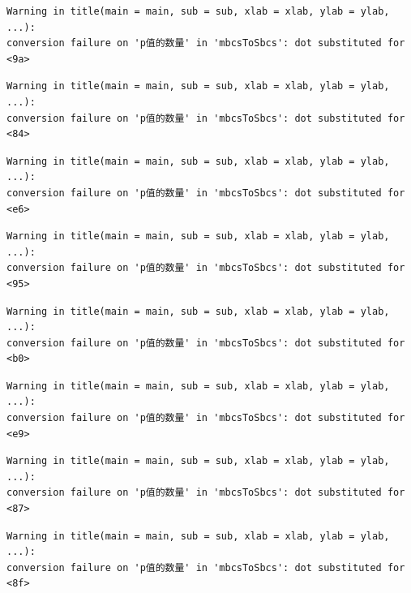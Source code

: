 \documentclass[
  letterpaper,
  DIV=11,
  numbers=noendperiod]{scrreprt}
\begin{document}
\begin{verbatim}
Warning in title(main = main, sub = sub, xlab = xlab, ylab = ylab, ...):
conversion failure on 'p值的数量' in 'mbcsToSbcs': dot substituted for <9a>
\end{verbatim}

\begin{verbatim}
Warning in title(main = main, sub = sub, xlab = xlab, ylab = ylab, ...):
conversion failure on 'p值的数量' in 'mbcsToSbcs': dot substituted for <84>
\end{verbatim}

\begin{verbatim}
Warning in title(main = main, sub = sub, xlab = xlab, ylab = ylab, ...):
conversion failure on 'p值的数量' in 'mbcsToSbcs': dot substituted for <e6>
\end{verbatim}

\begin{verbatim}
Warning in title(main = main, sub = sub, xlab = xlab, ylab = ylab, ...):
conversion failure on 'p值的数量' in 'mbcsToSbcs': dot substituted for <95>
\end{verbatim}

\begin{verbatim}
Warning in title(main = main, sub = sub, xlab = xlab, ylab = ylab, ...):
conversion failure on 'p值的数量' in 'mbcsToSbcs': dot substituted for <b0>
\end{verbatim}

\begin{verbatim}
Warning in title(main = main, sub = sub, xlab = xlab, ylab = ylab, ...):
conversion failure on 'p值的数量' in 'mbcsToSbcs': dot substituted for <e9>
\end{verbatim}

\begin{verbatim}
Warning in title(main = main, sub = sub, xlab = xlab, ylab = ylab, ...):
conversion failure on 'p值的数量' in 'mbcsToSbcs': dot substituted for <87>
\end{verbatim}

\begin{verbatim}
Warning in title(main = main, sub = sub, xlab = xlab, ylab = ylab, ...):
conversion failure on 'p值的数量' in 'mbcsToSbcs': dot substituted for <8f>
\end{verbatim}
\end{document}
